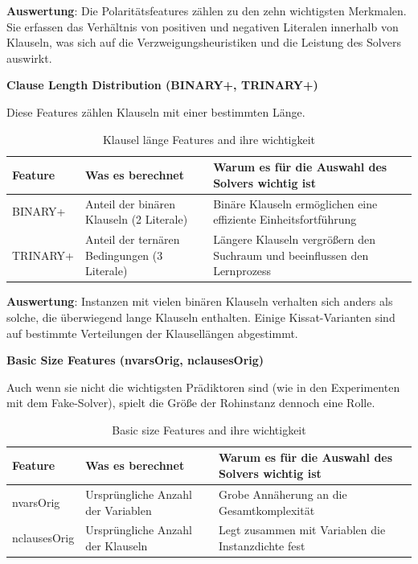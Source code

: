 \textbf{Auswertung}: Die Polaritätsfeatures zählen zu den zehn wichtigsten Merkmalen. Sie erfassen das 
Verhältnis von positiven und negativen Literalen innerhalb von Klauseln, was sich auf die Verzweigungsheuristiken 
und die Leistung des Solvers auswirkt.

\textbf{Clause Length Distribution (BINARY+, TRINARY+)}

Diese Features zählen Klauseln mit einer bestimmten Länge.

\begin{table}[H]
    \centering
    \begin{tabular}{p{}p{}p{}}
        \textbf{Feature} & \textbf{Was es berechnet} & \textbf{Warum es für die Auswahl des Solvers wichtig ist} \\
        \toprule
        BINARY+ & Anteil der binären Klauseln (2 Literale) & Binäre Klauseln ermöglichen eine effiziente Einheitsfortführung \\
        \midrule
        TRINARY+ & Anteil der ternären Bedingungen (3 Literale) & Längere Klauseln vergrößern den Suchraum und beeinflussen den Lernprozess \\
        \bottomrule
    \end{tabular}
    \caption{Klausel länge Features and ihre wichtigkeit}\label{tab:länge_features}
\end{table}

\textbf{Auswertung}: Instanzen mit vielen binären Klauseln verhalten sich anders als solche, die 
überwiegend lange Klauseln enthalten. Einige Kissat-Varianten sind auf bestimmte Verteilungen der 
Klausellängen abgestimmt.

\textbf{Basic Size Features (nvarsOrig, nclausesOrig)}

Auch wenn sie nicht die wichtigsten Prädiktoren sind (wie in den Experimenten mit dem Fake-Solver), 
spielt die Größe der Rohinstanz dennoch eine Rolle.

\begin{table}[H]
    \centering
    \begin{tabular}{p{}p{}p{}}
        \textbf{Feature} & \textbf{Was es berechnet} & \textbf{Warum es für die Auswahl des Solvers wichtig ist} \\
        \toprule
        nvarsOrig & Ursprüngliche Anzahl der Variablen & Grobe Annäherung an die Gesamtkomplexität \\
        \midrule
        nclausesOrig & Ursprüngliche Anzahl der Klauseln & Legt zusammen mit Variablen die Instanzdichte fest \\
        \bottomrule
    \end{tabular}
    \caption{Basic size Features and ihre wichtigkeit}\label{tab:size_features}
\end{table}

